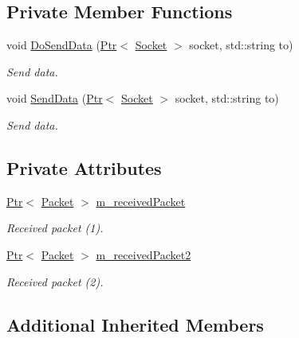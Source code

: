 \subsection*{Private Member Functions}
\begin{DoxyCompactItemize}
\item 
void \hyperlink{classIpv6RawSocketImplTest_a8740040a2cbd85d22d3bcfd2f68f9215}{Do\+Send\+Data} (\hyperlink{classns3_1_1Ptr}{Ptr}$<$ \hyperlink{classns3_1_1Socket}{Socket} $>$ socket, std\+::string to)
\begin{DoxyCompactList}\small\item\em Send data. \end{DoxyCompactList}\item 
void \hyperlink{classIpv6RawSocketImplTest_adc52ab615ef78fee05ac8783d94ce799}{Send\+Data} (\hyperlink{classns3_1_1Ptr}{Ptr}$<$ \hyperlink{classns3_1_1Socket}{Socket} $>$ socket, std\+::string to)
\begin{DoxyCompactList}\small\item\em Send data. \end{DoxyCompactList}\end{DoxyCompactItemize}
\subsection*{Private Attributes}
\begin{DoxyCompactItemize}
\item 
\hyperlink{classns3_1_1Ptr}{Ptr}$<$ \hyperlink{classns3_1_1Packet}{Packet} $>$ \hyperlink{classIpv6RawSocketImplTest_a57057bfb5f48de92165d7c3dfb8ff7ea}{m\+\_\+received\+Packet}
\begin{DoxyCompactList}\small\item\em Received packet (1). \end{DoxyCompactList}\item 
\hyperlink{classns3_1_1Ptr}{Ptr}$<$ \hyperlink{classns3_1_1Packet}{Packet} $>$ \hyperlink{classIpv6RawSocketImplTest_a1b23c24c9271e6874968546857829676}{m\+\_\+received\+Packet2}
\begin{DoxyCompactList}\small\item\em Received packet (2). \end{DoxyCompactList}\end{DoxyCompactItemize}
\subsection*{Additional Inherited Members}


